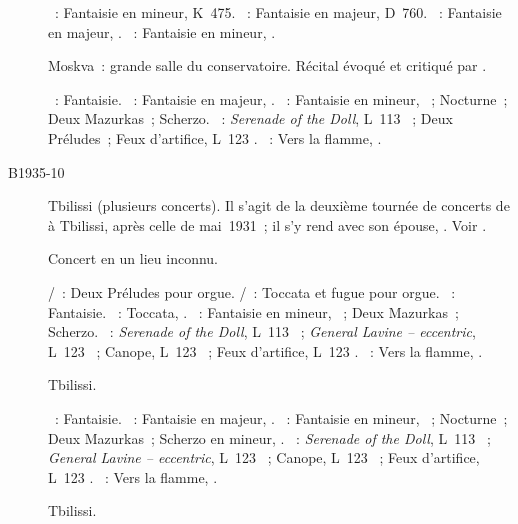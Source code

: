 \begin{description}
 \textsc{\Mozart{}}~: Fantaisie en \kC mineur, K~475.
 \textsc{\Schubert{}}~: Fantaisie  en \kC majeur, D~760.
 \textsc{\Schumann{}}~: Fantaisie en \kC majeur, .
 \textsc{\Chopin{}}~: Fantaisie en \kF mineur, .
 \item[\DateWithWeekDay{1935-09-18}]
 Moskva~: grande salle du conservatoire.
 Récital évoqué et critiqué par \citet{Drozdov35}.

 \textsc{\Mozart{}}~: Fantaisie.
 \textsc{\Schumann{}}~: Fantaisie en \kC majeur, .
 \textsc{\Chopin{}}~: Fantaisie en \kF mineur, ~; Nocturne~; Deux
 Mazurkas~; Scherzo.
 \textsc{\Debussy{}}~: \emph{Serenade of the Doll}, L~113 ~;
 Deux Préludes~; Feux d'artifice, L~123 .
 \textsc{\Scriabine{}}~: Vers la flamme, .
 \item[B1935-10]
 Tbilissi (plusieurs concerts).
 Il s'agit de la deuxième tournée de concerts de \VSofronitsky{} à Tbilissi,
 après celle de mai~1931~; il s'y rend avec son épouse, \ESofronitskaya{}.
 Voir \citet[p.~157]{Nekrasova08}.
 \item[\DateWithWeekDay{1935-10-19}]
 Concert en un lieu inconnu.

 \textsc{\JBach{}/\Ziloti{}}~: Deux Préludes pour orgue.
 \textsc{\JBach{}/\Busoni{}}~: Toccata et fugue pour orgue.
 \textsc{\Mozart{}}~: Fantaisie.
 \textsc{\Schumann{}}~: Toccata, .
 \textsc{\Chopin{}}~: Fantaisie en \kF mineur, ~; Deux Mazurkas~;
 Scherzo.
 \textsc{\Debussy{}}~: \emph{Serenade of the Doll}, L~113 ~;
 \emph{General Lavine -- eccentric}, L~123 ~; Canope, L~123
 ~; Feux d'artifice, L~123 .
 \textsc{\Scriabine{}}~: Vers la flamme, .
 \item[\DateWithWeekDay{1935-10-27}]
 Tbilissi.

 \textsc{\Mozart{}}~: Fantaisie.
 \textsc{\Schumann{}}~: Fantaisie en \kC majeur, .
 \textsc{\Chopin{}}~: Fantaisie en \kF mineur, ~; Nocturne~; Deux
 Mazurkas~; Scherzo en \kB mineur, .
 \textsc{\Debussy{}}~: \emph{Serenade of the Doll}, L~113 ~;
 \emph{General Lavine -- eccentric}, L~123 ~; Canope, L~123
 ~; Feux d'artifice, L~123 .
 \textsc{\Scriabine{}}~: Vers la flamme, .
 \item[\DateWithWeekDay{1935-10-30}]
 Tbilissi.


\end{description}
